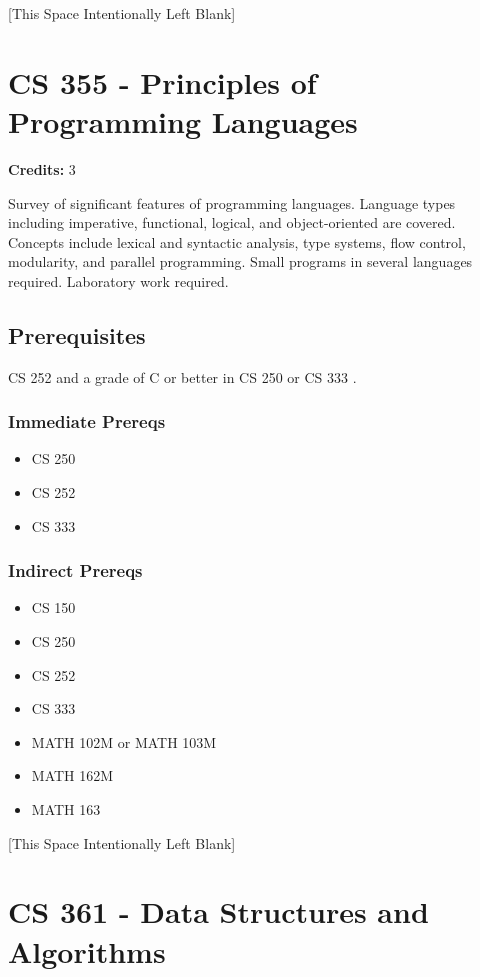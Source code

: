 \documentclass[]{article}
\providecommand{\tightlist}{%
  \setlength{\itemsep}{0pt}\setlength{\parskip}{0pt}}
\newcommand{\pagebreakhere}{
\vspace*{\fill}
\begin{center}
[This Space Intentionally Left Blank]
\end{center}
\vspace*{\fill}
\newpage
}
\begin{document}
\pagebreakhere
\section{CS 355 - Principles of Programming
Languages}\label{cs-355---principles-of-programming-languages}

\textbf{Credits:} 3

Survey of significant features of programming languages. Language types
including imperative, functional, logical, and object-oriented are
covered. Concepts include lexical and syntactic analysis, type systems,
flow control, modularity, and parallel programming. Small programs in
several languages required. Laboratory work required.

\subsection{Prerequisites}\label{prerequisites-18}

CS 252 and a grade of C or better in CS 250 or CS 333 .

\subsubsection{Immediate Prereqs}\label{immediate-prereqs-13}

\begin{itemize}
\tightlist
\item
  CS 250
\item
  CS 252
\item
  CS 333
\end{itemize}

\subsubsection{Indirect Prereqs}\label{indirect-prereqs-13}

\begin{itemize}
\tightlist
\item
  CS 150
\item
  CS 250
\item
  CS 252
\item
  CS 333
\item
  MATH 102M or MATH 103M
\item
  MATH 162M
\item
  MATH 163
\end{itemize}

\pagebreakhere
\section{CS 361 - Data Structures and
Algorithms}\label{cs-361---data-structures-and-algorithms}
\end{document}
